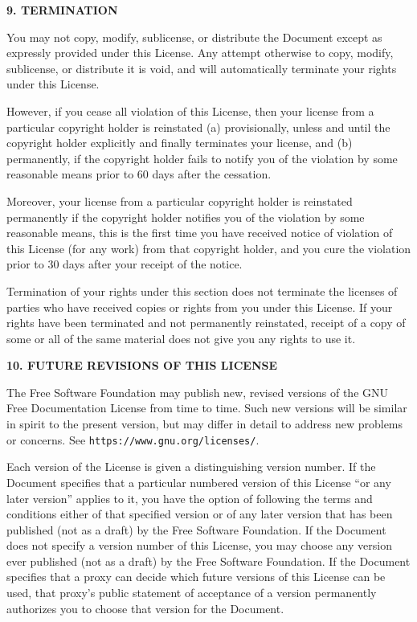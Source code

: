 \begin{center}
{\Large\bf 9. TERMINATION\par}
{}
\end{center}


You may not copy, modify, sublicense, or distribute the Document
except as expressly provided under this License.  Any attempt
otherwise to copy, modify, sublicense, or distribute it is void, and
will automatically terminate your rights under this License.

However, if you cease all violation of this License, then your license
from a particular copyright holder is reinstated (a) provisionally,
unless and until the copyright holder explicitly and finally
terminates your license, and (b) permanently, if the copyright holder
fails to notify you of the violation by some reasonable means prior to
60 days after the cessation.

Moreover, your license from a particular copyright holder is
reinstated permanently if the copyright holder notifies you of the
violation by some reasonable means, this is the first time you have
received notice of violation of this License (for any work) from that
copyright holder, and you cure the violation prior to 30 days after
your receipt of the notice.

Termination of your rights under this section does not terminate the
licenses of parties who have received copies or rights from you under
this License.  If your rights have been terminated and not permanently
reinstated, receipt of a copy of some or all of the same material does
not give you any rights to use it.


\begin{center}
{\Large\bf 10. FUTURE REVISIONS OF THIS LICENSE\par}
{}
\end{center}


The Free Software Foundation may publish new, revised versions
of the GNU Free Documentation License from time to time.  Such new
versions will be similar in spirit to the present version, but may
differ in detail to address new problems or concerns.  See
\texttt{https://www.gnu.org/licenses/}.

Each version of the License is given a distinguishing version number.
If the Document specifies that a particular numbered version of this
License ``or any later version'' applies to it, you have the option of
following the terms and conditions either of that specified version or
of any later version that has been published (not as a draft) by the
Free Software Foundation.  If the Document does not specify a version
number of this License, you may choose any version ever published (not
as a draft) by the Free Software Foundation.  If the Document
specifies that a proxy can decide which future versions of this
License can be used, that proxy's public statement of acceptance of a
version permanently authorizes you to choose that version for the
Document.


